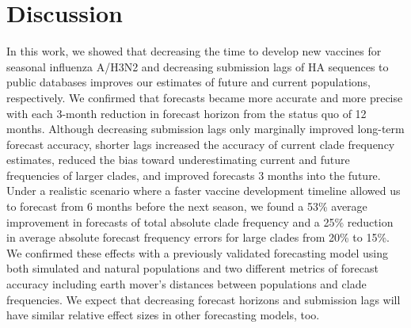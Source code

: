 \documentclass[9pt,lineno]{elife}
\begin{document}
\begin{figure}[htb!]
%
\label{figdata:h3n2_optimal_effects_of_realistic_interventions}
\label{figsrccode:optimal_effects_of_realistic_interventions_on_distances_to_the_future}
\end{figure}

\section{Discussion}

In this work, we showed that decreasing the time to develop new vaccines for seasonal influenza A/H3N2 and decreasing submission lags of HA sequences to public databases improves our estimates of future and current populations, respectively.
We confirmed that forecasts became more accurate and more precise with each 3-month reduction in forecast horizon from the status quo of 12 months.
Although decreasing submission lags only marginally improved long-term forecast accuracy, shorter lags increased the accuracy of current clade frequency estimates, reduced the bias toward underestimating current and future frequencies of larger clades, and improved forecasts 3 months into the future.
Under a realistic scenario where a faster vaccine development timeline allowed us to forecast from 6 months before the next season, we found a 53\% average improvement in forecasts of total absolute clade frequency and a 25\% reduction in average absolute forecast frequency errors for large clades from 20\% to 15\%.
We confirmed these effects with a previously validated forecasting model using both simulated and natural populations and two different metrics of forecast accuracy including earth mover's distances between populations and clade frequencies.
We expect that decreasing forecast horizons and submission lags will have similar relative effect sizes in other forecasting models, too.
\end{document}
